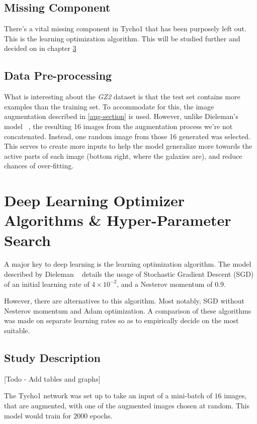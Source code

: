 \documentclass[12pt,a4paper,oneside,oldfontcommands]{memoir}
\begin{document}
\section{Missing Component}
There's a vital missing component in Tycho1 that has been purposely left out. This is the learning optimization algorithm. This will be studied further and decided on in chapter \ref{study}

\section{Data Pre-processing}

What is interesting about the \textit{GZ2} dataset is that the test set contains more examples than the training set. To accommodate for this, the image augmentation described in \ref{aug-section} is used. However, unlike Dieleman's model ~\cite{Sanders-GZ}, the resulting 16 images from the augmentation process we’re not concatenated. Instead, one random image from those 16 generated was selected. This serves to create more inputs to help the model generalize more towards the active parts of each image (bottom right, where the galaxies are), and reduce chances of over-fitting. 

\chapter{Deep Learning Optimizer Algorithms \& Hyper-Parameter Search} \label{study}

A major key to deep learning is the learning optimization algorithm. The model described by Dieleman ~\cite{Sanders-GZ} details the usage of Stochastic Gradient Descent (SGD) of an initial learning rate of \(4\times10^{-2}\), and a Nesterov momentum of \(0.9\). 

However, there are alternatives to this algorithm. Most notably, SGD without Nesterov momentum and Adam optimization. A comparison of these algorithms was made on separate learning rates so as to empirically decide on the most suitable.

\section{Study Description}

[Todo - Add tables and graphs]

The Tycho1 network was set up to take an input of a mini-batch of \(16\) images, that are augmented, with one of the augmented images chosen at random. This model would train for \(2000\) epochs. 
\end{document}
